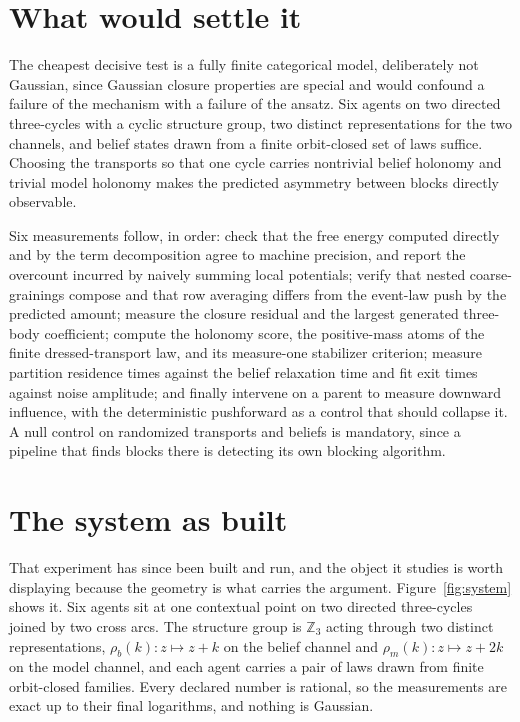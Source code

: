 \documentclass[11pt,letterpaper]{article}
\begin{document}
\section{What would settle it}

The cheapest decisive test is a fully finite categorical model, deliberately not
Gaussian, since Gaussian closure properties are special and would confound a failure
of the mechanism with a failure of the ansatz. Six agents on two directed three-cycles
with a cyclic structure group, two distinct representations for the two channels, and
belief states drawn from a finite orbit-closed set of laws suffice. Choosing the
transports so that one cycle carries nontrivial belief holonomy and trivial model
holonomy makes the predicted asymmetry between blocks directly observable.

Six measurements follow, in order: check that the free energy computed directly and by
the term decomposition agree to machine precision, and report the overcount incurred by
naively summing local potentials; verify that nested coarse-grainings compose and that
row averaging differs from the event-law push by the predicted amount; measure the
closure residual and the largest generated three-body coefficient; compute the holonomy
score, the positive-mass atoms of the finite dressed-transport law, and its measure-one
stabilizer criterion; measure partition residence times against the belief relaxation
time and fit exit times against noise amplitude; and
finally intervene on a parent to measure downward influence, with the deterministic
pushforward as a control that should collapse it. A null control on randomized
transports and beliefs is mandatory, since a pipeline that finds blocks there is
detecting its own blocking algorithm.

\section{The system as built}

That experiment has since been built and run, and the object it studies is worth
displaying because the geometry is what carries the argument.
Figure~\ref{fig:system} shows it. Six agents sit at one contextual point on two
directed three-cycles joined by two cross arcs. The structure group is $\mathbb Z_3$
acting through two distinct representations, $\rho_b(k):z\mapsto z+k$ on the belief
channel and $\rho_m(k):z\mapsto z+2k$ on the model channel, and each agent carries a
pair of laws drawn from finite orbit-closed families. Every declared number is
rational, so the measurements are exact up to their final logarithms, and nothing is
Gaussian.
\end{document}
